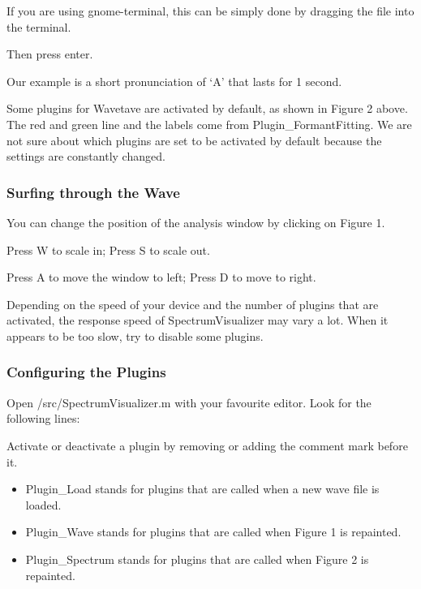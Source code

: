         If you are using gnome-terminal, this can be simply done by dragging the file into the terminal.

        Then press enter.
        
        Our example is a short pronunciation of `A' that lasts for 1 second.
        
        \newpage
        
        
        Some plugins for Wavetave are activated by default, as shown in Figure 2 above. The red and green line and the labels come from Plugin\_FormantFitting. We are not sure about which plugins are set to be activated by default because the settings are constantly changed.
        
        \subsubsection{Surfing through the Wave}\indent
        
        You can change the position of the analysis window by clicking on Figure 1.
        
        Press W to scale in; Press S to scale out.
        
        Press A to move the window to left; Press D to move to right.
        
        Depending on the speed of your device and the number of plugins that are activated, the response speed of SpectrumVisualizer may vary a lot. When it appears to be too slow, try to disable some plugins.
        
        \subsubsection{Configuring the Plugins}\indent
        
        Open /src/SpectrumVisualizer.m with your favourite editor. Look for the following lines:
        
        \lstset{language = octave, tabsize = 8}
        
        
        Activate or deactivate a plugin by removing or adding the comment mark before it.
        
        \begin{itemize}
                \item Plugin\_Load stands for plugins that are called when a new wave file is loaded.
                \item Plugin\_Wave stands for plugins that are called when Figure 1 is repainted.
                \item Plugin\_Spectrum stands for plugins that are called when Figure 2 is repainted.
        \end{itemize}
        
